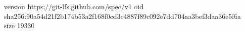 version https://git-lfs.github.com/spec/v1
oid sha256:90a54d21f2b174b53a2f168f0cd3c4887f89c092e7dd704aa3bef3daa36e5f6a
size 19330
